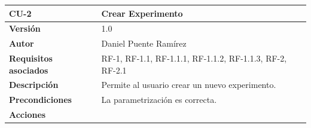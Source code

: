 \begin{longtable}[H]{@{}ll@{}}
\toprule
\begin{minipage}[b]{0.23\columnwidth}\raggedright\strut
\textbf{CU-2}\strut
\end{minipage} & \begin{minipage}[b]{0.71\columnwidth}\raggedright\strut
\textbf{Crear Experimento}\strut
\end{minipage}\tabularnewline
\midrule
\endhead
\begin{minipage}[t]{0.23\columnwidth}\raggedright\strut
\textbf{Versión}\strut
\end{minipage} & \begin{minipage}[t]{0.71\columnwidth}\raggedright\strut
1.0\strut
\end{minipage}\tabularnewline
\begin{minipage}[t]{0.23\columnwidth}\raggedright\strut
\textbf{Autor}\strut
\end{minipage} & \begin{minipage}[t]{0.71\columnwidth}\raggedright\strut
Daniel Puente Ramírez\strut
\end{minipage}\tabularnewline
\begin{minipage}[t]{0.23\columnwidth}\raggedright\strut
\textbf{Requisitos asociados}\strut
\end{minipage} & \begin{minipage}[t]{0.71\columnwidth}\raggedright\strut
RF-1, RF-1.1, RF-1.1.1, RF-1.1.2, RF-1.1.3, RF-2, RF-2.1\strut
\end{minipage}\tabularnewline
\begin{minipage}[t]{0.23\columnwidth}\raggedright\strut
\textbf{Descripción}\strut
\end{minipage} & \begin{minipage}[t]{0.71\columnwidth}\raggedright\strut
Permite al usuario crear un nuevo experimento.\strut
\end{minipage}\tabularnewline
\begin{minipage}[t]{0.23\columnwidth}\raggedright\strut
\textbf{Precondiciones}\strut
\end{minipage} & \begin{minipage}[t]{0.71\columnwidth}\raggedright\strut
La parametrización es correcta.\strut
\end{minipage}\tabularnewline
\begin{minipage}[t]{0.23\columnwidth}\raggedright\strut
\textbf{Acciones}\strut
\end{minipage} & \begin{minipage}[t]{0.71\columnwidth}\raggedright\strut

\end{minipage}
\end{longtable}
